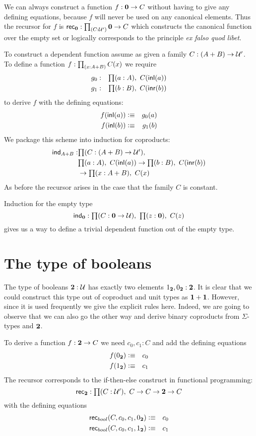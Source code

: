 We can always construct a function $f : \mathbf{0} \to C$ without
having to give any defining equations, because $f$ will never be
used on any canonical elements. Thus the recursor for $f$ is
$\rec{\emptyt} : \prd{C:\UU'} \emptyt \to C$
which constructs the canonical function over the empty set or
logically corresponds to the principle \emph{ex falso quod libet}. 

To construct a dependent function assume as given a family 
$C: (A + B) \to \mathcal{U}'$. To define a function $f:\prd{x:A+B}C(x)$ we
require 
\begin{eqnarray*}
  g_0 & : & \prd{a:A} C(\inl(a)) \\
  g_1 & : & \prd{b:B} C(\inr(b))
\end{eqnarray*}
to derive $f$ with the defining equations:
\begin{eqnarray*}
  f({\mathsf{inl}}(a)) & \vcentcolon\equiv & g_0(a) \\
  f({\mathsf{inl}}(b)) & \vcentcolon\equiv & g_1(b) 
\end{eqnarray*}
We package this scheme into induction for coproducts:
\begin{align*}
 \ind{A+B} : & \prd{C: (A + B) \to \UU'}   \\
& \prd{a:A} C(\inl(a)) \to \prd{b:B} C(\inr(b))\\
& \to \prd{x:A+B}C(x) 
\end{align*}
As before the recursor arises in the case that the family $C$ is
constant. 

Induction for the empty type
\[ \ind{\emptyt} : \prd{C:\emptyt \to \UU}\prd{z:\emptyt} C(z) \]
gives us a way to define a trivial dependent function out of the
empty type. %

\section{The type of booleans}
\label{sec:type-booleans}

The type of booleans $\mathbf{2}:\mathcal{U}$ has exactly two elements 
${1_{\mathbf{2}}},{0_{\mathbf{2}}} : \mathbf{2}$. It is clear that we could construct this
type out of coproduct and unit types as $\mathbf{1} + \mathbf{1}$. However,
since it is used frequently we give the explicit rules here.
Indeed, we are going to observe that we can also go the other way
and derive binary coproducts from $\Sigma$-types and $\mathbf{2}$.

To derive a function $f : \mathbf{2} \to C$ we need $c_0,c_1 : C$ and
add the defining equations
\begin{eqnarray*}
  f({0_{\mathbf{2}}}) & \vcentcolon\equiv & c_0 \\
  f({1_{\mathbf{2}}}) & \vcentcolon\equiv & c_1
\end{eqnarray*}
The recursor corresponds to the if-then-else construct in
functional programming:
\[ \rec{\bool} : \prd{C:\UU'}  C \to C \to \bool \to C \]
with the defining equations
\begin{eqnarray*}
  \mathsf{rec}_{bool}(C,c_0,c_1,{0_{\mathbf{2}}}) & \vcentcolon\equiv & c_0 \\
  \mathsf{rec}_{bool}(C,c_0,c_1,{1_{\mathbf{2}}}) & \vcentcolon\equiv & c_1
\end{eqnarray*}

